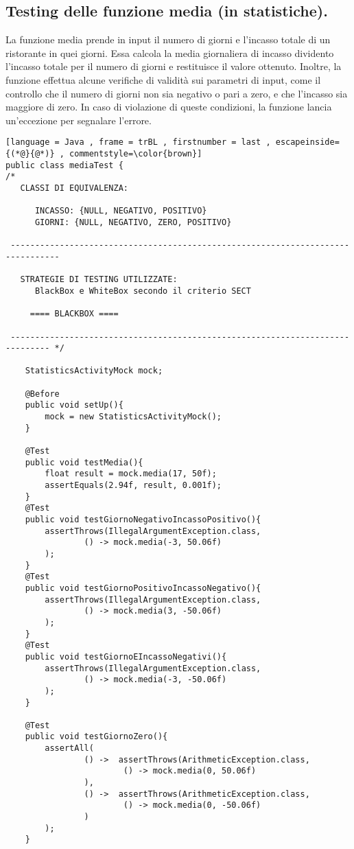 \subsection{Testing delle funzione media (in statistiche).}
\begin{flushleft}
    La funzione media prende in input il numero di giorni e l'incasso totale di un ristorante in quei giorni.
     Essa calcola la media giornaliera di incasso dividento l'incasso totale per il numero di giorni e restituisce 
     il valore ottenuto. Inoltre, la funzione effettua alcune verifiche di validità sui parametri di input, come il 
     controllo che il numero di giorni non sia negativo o pari a zero, e che l'incasso sia maggiore di zero. In caso
      di violazione di queste condizioni, la funzione lancia un'eccezione per segnalare l'errore.
\end{flushleft}
\vspace{0.2cm}
\begin{lstlisting}[language = Java , frame = trBL , firstnumber = last , escapeinside={(*@}{@*)} , commentstyle=\color{brown}]
public class mediaTest {
/*
   CLASSI DI EQUIVALENZA:

      INCASSO: {NULL, NEGATIVO, POSITIVO}
      GIORNI: {NULL, NEGATIVO, ZERO, POSITIVO}

 --------------------------------------------------------------------------------

   STRATEGIE DI TESTING UTILIZZATE:
      BlackBox e WhiteBox secondo il criterio SECT

     ==== BLACKBOX ====

 ------------------------------------------------------------------------------ */

    StatisticsActivityMock mock;

    @Before
    public void setUp(){
        mock = new StatisticsActivityMock();
    }

    @Test
    public void testMedia(){
        float result = mock.media(17, 50f);
        assertEquals(2.94f, result, 0.001f);
    }
    @Test
    public void testGiornoNegativoIncassoPositivo(){
        assertThrows(IllegalArgumentException.class,
                () -> mock.media(-3, 50.06f)
        );
    }
    @Test
    public void testGiornoPositivoIncassoNegativo(){
        assertThrows(IllegalArgumentException.class,
                () -> mock.media(3, -50.06f)
        );
    }
    @Test
    public void testGiornoEIncassoNegativi(){
        assertThrows(IllegalArgumentException.class,
                () -> mock.media(-3, -50.06f)
        );
    }

    @Test
    public void testGiornoZero(){
        assertAll(
                () ->  assertThrows(ArithmeticException.class,
                        () -> mock.media(0, 50.06f)
                ),
                () ->  assertThrows(ArithmeticException.class,
                        () -> mock.media(0, -50.06f)
                )
        );
    }
\end{lstlisting}
\vspace{0.2cm}

